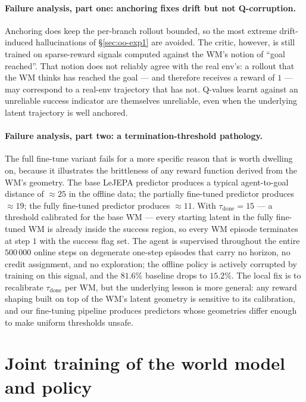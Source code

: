 \paragraph{Failure analysis, part one: anchoring fixes drift but not Q-corruption.} Anchoring does keep the per-branch rollout bounded, so the most extreme drift-induced hallucinations of \S\ref{sec:oo-exp1} are avoided. The critic, however, is still trained on sparse-reward signals computed against the WM's notion of ``goal reached''. That notion does not reliably agree with the real env's: a rollout that the WM thinks has reached the goal --- and therefore receives a reward of $1$ --- may correspond to a real-env trajectory that has not. Q-values learnt against an unreliable success indicator are themselves unreliable, even when the underlying latent trajectory is well anchored.

\paragraph{Failure analysis, part two: a termination-threshold pathology.} The full fine-tune variant fails for a more specific reason that is worth dwelling on, because it illustrates the brittleness of any reward function derived from the WM's geometry. The base LeJEPA predictor produces a typical agent-to-goal distance of $\approx 25$ in the offline data; the partially fine-tuned predictor produces $\approx 19$; the fully fine-tuned predictor produces $\approx 11$. With $\tau_{\text{done}} = 15$ --- a threshold calibrated for the base WM --- every starting latent in the fully fine-tuned WM is already inside the success region, so every WM episode terminates at step $1$ with the success flag set. The agent is supervised throughout the entire $500\,000$ online steps on degenerate one-step episodes that carry no horizon, no credit assignment, and no exploration; the offline policy is actively corrupted by training on this signal, and the $81.6\%$ baseline drops to $15.2\%$. The local fix is to recalibrate $\tau_{\text{done}}$ per WM, but the underlying lesson is more general: any reward shaping built on top of the WM's latent geometry is sensitive to its calibration, and our fine-tuning pipeline produces predictors whose geometries differ enough to make uniform thresholds unsafe.

\section{Joint training of the world model and policy}
\label{sec:oo-exp3}

